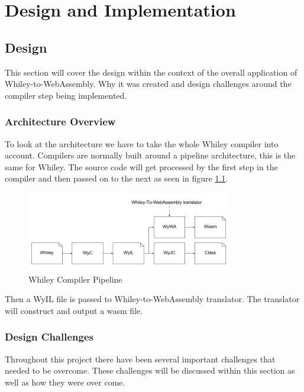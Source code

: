 \chapter{Design and Implementation}\label{C:di}

\section{Design}
This section will cover the design within the context of the overall application of Whiley-to-WebAssembly. Why it was created and design challenges around the compiler step being implemented.

\subsection{Architecture Overview}

To look at the architecture we have to take the whole Whiley compiler into account. Compilers are normally built around a pipeline architecture, this is the same for Whiley. The source code will get processed by the first step in the compiler and then passed on to the next as seen in figure \ref{fig:arc}. 

\begin{figure}[H]
  \centering
  \includegraphics[width=0.8\textwidth]{My_Preposed_Extention}
  \caption{Whiley Compiler Pipeline}
  \label{fig:arc}
\end{figure}

Then a WyIL file is passed to Whiley-to-WebAssembly translator. The translator will construct and output a wasm file. 


\subsection{Design Challenges}\label{subsec:didc}

Throughout this project there have been several important challenges that needed to be overcome. These challenges will be discussed within this section as well as how they were over come. 

